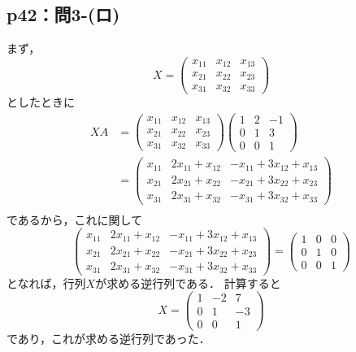\documentclass[a4paper,10pt,fleqn]{ltjsarticle}
\begin{document}
\subsection*{p42：問3-(ロ)}

\begin{leftbar}
  まず，
  \[
    X= \begin{pmatrix} x_{11} & x_{12} & x_{13} \\x_{21} & x_{22} & x_{23} \\x_{31} & x_{32} & x_{33}  \end{pmatrix}
  \]
  としたときに
  \begin{align*}
    XA & =  \begin{pmatrix} x_{11} & x_{12} & x_{13} \\x_{21} & x_{22} & x_{23} \\x_{31} & x_{32} & x_{33}  \end{pmatrix}
    \begin{pmatrix} 1 & 2 & -1 \\ 0& 1 & 3 \\ 0 & 0 & 1 \end{pmatrix}                                                                                                                                          \\
       & = \begin{pmatrix} x_{11} & 2x_{11} + x_{12} & -x_{11} +3x_{12} +x_{13} \\ x_{21} & 2x_{21} + x_{22} & -x_{21} +3x_{22} +x_{23} \\  x_{31} & 2x_{31} + x_{32} & -x_{31} +3x_{32} +x_{33} \end{pmatrix} \\
  \end{align*}
  であるから，これに関して
  \[
    \begin{pmatrix} x_{11} & 2x_{11} + x_{12} & -x_{11} +3x_{12} +x_{13} \\ x_{21} & 2x_{21} + x_{22} & -x_{21} +3x_{22} +x_{23} \\  x_{31} & 2x_{31} + x_{32} & -x_{31} +3x_{32} +x_{33} \end{pmatrix} = \begin{pmatrix} 1 & 0 & 0 \\ 0 & 1 & 0 \\ 0 & 0 & 1 \end{pmatrix}
  \]
  となれば，行列$X$が求める逆行列である．
  計算すると
  \[
    X = \begin{pmatrix} 1 & -2 & 7 \\ 0 & 1 & -3 \\ 0 & 0 & 1 \end{pmatrix}
  \]
  であり，これが求める逆行列であった．
\end{leftbar}
\end{document}
